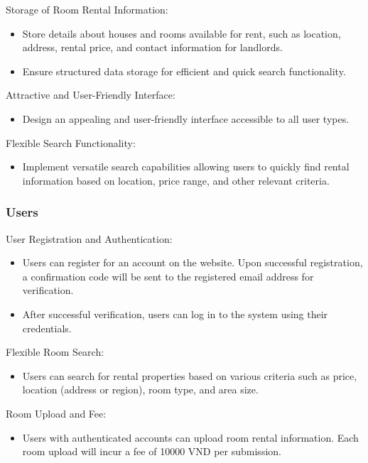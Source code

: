\documentclass[../Main.tex]{subfiles}
\begin{document}
Storage of Room Rental Information:
\begin{itemize}
    \item Store details about houses and rooms available for rent, such as location, address, rental price, and contact information for landlords.
    \item Ensure structured data storage for efficient and quick search functionality.
\end{itemize}
Attractive and User-Friendly Interface:
\begin{itemize}
    \item Design an appealing and user-friendly interface accessible to all user types.
\end{itemize}
Flexible Search Functionality:
\begin{itemize}
    \item Implement versatile search capabilities allowing users to quickly find rental information based on location, price range, and other relevant criteria.
\end{itemize}

\subsubsection{Users}

User Registration and Authentication:
\begin{itemize}
    \item Users can register for an account on the website.
          Upon successful registration, a confirmation code will be sent to the registered email address for verification.
    \item After successful verification, users can log in to the system using their credentials.
\end{itemize}

Flexible Room Search:
\begin{itemize}
    \item Users can search for rental properties based on various criteria such as price, location (address or region), room type, and area size.
\end{itemize}

Room Upload and Fee:
\begin{itemize}
    \item Users with authenticated accounts can upload room rental information.
          Each room upload will incur a fee of 10000 VND per submission.
\end{itemize}
\end{document}
